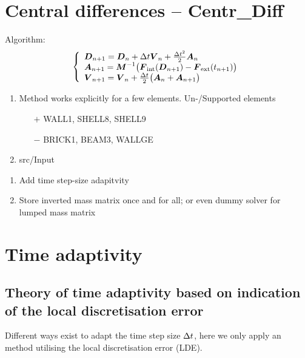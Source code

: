\section{Central differences -- \ccarat Centr\_Diff}
Algorithm:
\begin{gather*}
  \left\{\begin{array}{l}
     \boldsymbol{D}_{n+1} = \boldsymbol{D}_n + \Delta t \boldsymbol{V}_n + \frac{\Delta t^2}{2} \boldsymbol{A}_n
  \\
     \boldsymbol{A}_{n+1} = \boldsymbol{M}^{-1} \big( 
                     \boldsymbol{F}_{\text{int}}(\boldsymbol{D}_{n+1}) 
                     - \boldsymbol{F}_{\text{ext}}(t_{n+1})
                     \big)
  \\
     \boldsymbol{V}_{n+1} 
               = \boldsymbol{V}_n + \frac{\Delta t}{2} \big( 
               \boldsymbol{A}_n + \boldsymbol{A}_{n+1} \big)
  \end{array}\right.
\end{gather*}
\begin{enumerate}
\item Method works explicitly for a few elements. Un-/Supported elements
  \begin{itemize}
  \item[$+$] WALL1, SHELL8, SHELL9
  \item[$-$] BRICK1, BEAM3, WALLGE
  \end{itemize}
\item src/Input 
\end{enumerate}

\begin{enumerate}
\item Add time step-size adapitvity
\item Store inverted mass matrix once and for all; or even dummy solver for
  lumped mass matrix
\end{enumerate}

\section{Time adaptivity}

\subsection{Theory of time adaptivity based on indication of the local discretisation error}
Different ways exist to adapt the time step size $\Delta t$, here we only apply an  method utilising the local discretisation error (LDE). 



